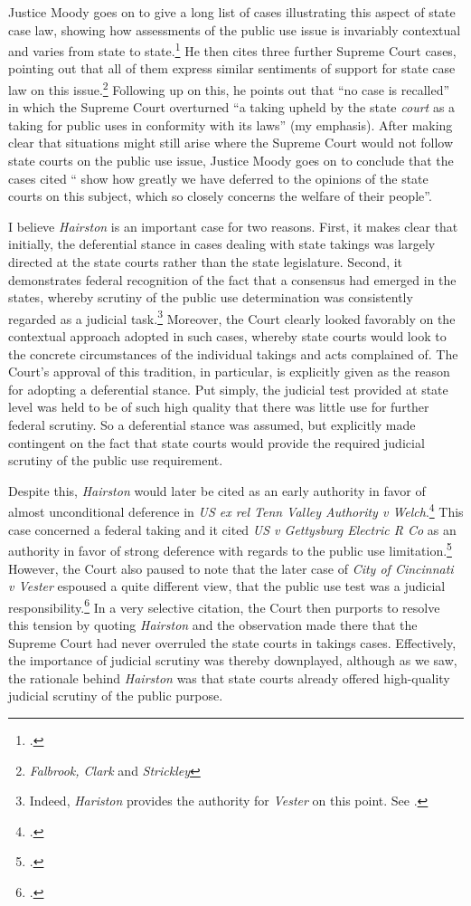 Justice Moody goes on to give a long list of cases illustrating this aspect of state case law, showing how assessments of the public use issue is invariably contextual and varies from state to state.\footcite[607]{hairston08} He then cites three further Supreme Court cases, pointing out that all of them express similar sentiments of support for state case law on this issue.\footnote{{\it Falbrook, Clark} and {\it Strickley}} Following up on this, he points out that ``no case is recalled'' in which the Supreme Court overturned ``a taking upheld by the state {\it court} as a taking for public uses in conformity with its laws'' (my emphasis). After making clear that situations might still arise where the Supreme Court would not follow state courts on the public use issue, Justice Moody goes on to conclude that the cases cited `` show how greatly we have deferred to the opinions of the state courts on this subject, which so closely concerns the welfare of their people''.

I believe {\it Hairston} is an important case for two reasons. First, it makes clear that initially, the deferential stance in cases dealing with state takings was largely directed at the state courts rather than the state legislature. Second, it demonstrates federal recognition of the fact that a consensus had emerged in the states, whereby scrutiny of the public use determination was consistently regarded as a judicial task.\footnote{Indeed, {\it Hariston} provides the authority for {\it Vester} on this point. See \cite[606]{vester30}.} Moreover, the Court clearly looked favorably on the contextual approach adopted in such cases, whereby state courts would look to the concrete circumstances of the individual takings and acts complained of. The Court's approval of this tradition, in particular, is explicitly given as the reason for adopting a deferential stance. Put simply, the judicial test provided at state level was held to be of such high quality that there was little use for further federal scrutiny. So a deferential stance was assumed, but explicitly made contingent on the fact that state courts would provide the required judicial scrutiny of the public use requirement.

Despite this, {\it Hairston} would later be cited as an early authority in favor of almost unconditional deference in {\it US ex rel Tenn Valley Authority v Welch}.\footcite[552]{welch46} This case concerned a federal taking and it cited {\it US v Gettysburg Electric R Co} as an authority in favor of strong deference with regards to the public use limitation.\footcite{gettysburg96} However, the Court also paused to note that the later case of {\it City of Cincinnati v Vester} espoused a quite different view, that the public use test was a judicial responsibility.\footcite{vester30} In a very selective citation, the Court then purports to resolve this tension by quoting {\it Hairston} and the observation made there that the Supreme Court had never overruled the state courts in takings cases. Effectively, the importance of judicial scrutiny was thereby downplayed, although as we saw, the rationale behind {\it Hairston} was that state courts already offered high-quality judicial scrutiny of the public purpose.

